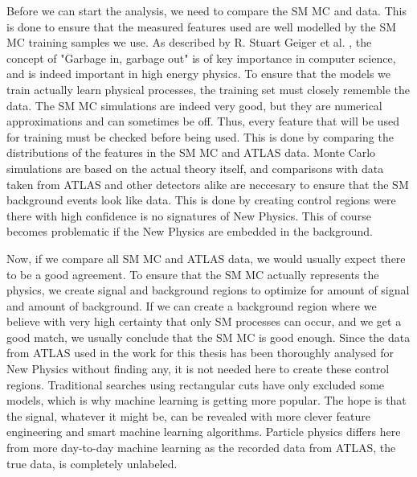 Before we can start the analysis, we need to compare the SM MC and data. This is done to ensure that the measured features used 
are well modelled by the SM MC training samples we use. As described by R. Stuart Geiger et al. \cite{DBLP:journals/corr/abs-2107-02278}, the concept of "Garbage 
in, garbage out" is of key importance in computer science, and is indeed important in high energy physics. To ensure that the models 
we train actually learn physical processes, the training set must closely rememble the data. The SM MC simulations are indeed very good, 
but they are numerical approximations and can 
sometimes be off. Thus, every feature that will be used for training must be checked before being used. This is done by 
comparing the distributions of the features in the SM MC and ATLAS data. Monte Carlo simulations are based on the actual theory 
itself, and comparisons with data taken from ATLAS and other detectors alike are neccesary to ensure that the SM background 
events look like data. This is done by creating control regions were there with high confidence is no signatures of New Physics. 
This of course becomes problematic if the New Physics are embedded in the background.\par
Now, if we compare all SM MC and ATLAS data, we would usually expect there to be a good agreement. To ensure that the SM MC actually 
represents the physics, we create signal and background regions to optimize for amount of signal and amount of background. If we can 
create a background region where we believe with very high certainty that only SM processes can occur, and we get a good match, 
we usually conclude that the SM MC is good enough. Since the data from ATLAS used in the work for this thesis has been thoroughly 
analysed for New Physics without finding any, it is not needed here to create these control regions. Traditional searches using 
rectangular cuts have only excluded some models, which is why machine learning is getting more popular. The hope is that the signal, 
whatever it might be, can be revealed with more clever feature engineering and smart machine learning algorithms. 
Particle physics differs here from more day-to-day machine learning as the recorded data from ATLAS, the true data, is completely 
unlabeled. 


